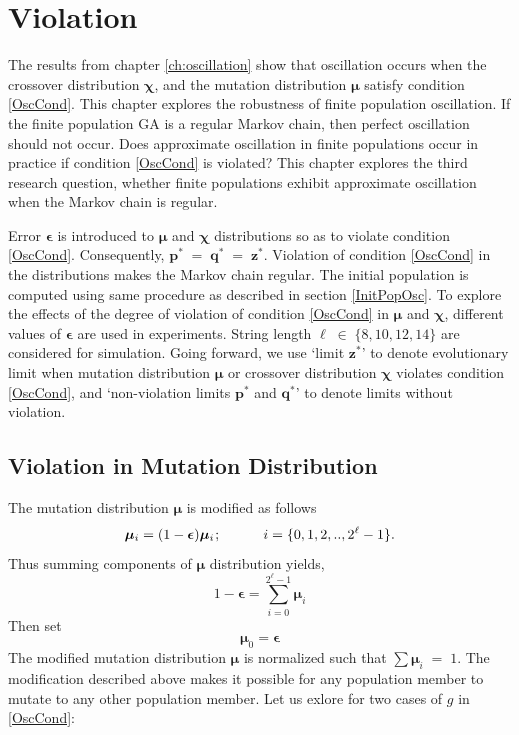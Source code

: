 \chapter{Violation} \label{ch:evolutionary limits}
The results from chapter \ref{ch:oscillation} show that oscillation occurs
when the crossover distribution $\bm{\chi}$, and the mutation distribution $\bm{\mu}$ 
satisfy condition \ref{OscCond}. This chapter explores the robustness of finite population oscillation. 
If the finite population GA is a regular Markov chain, then perfect oscillation should not occur. Does approximate oscillation 
in finite populations occur in practice if condition \ref{OscCond} is violated? 
This chapter explores the  
third research question, whether finite populations exhibit approximate oscillation when the Markov chain 
is regular.

Error $\bm{\epsilon}$ is introduced to $\bm{\mu}$ and $\bm{\chi}$ distributions so as to 
violate condition \ref{OscCond}. Consequently, $\bm{p}^\ast \;=\; \bm{q}^\ast \;=\; \bm{z}^\ast$. 
Violation of condition \ref{OscCond} in the distributions makes the Markov chain regular. The initial population is 
computed using same procedure as described in section \ref{InitPopOsc}. To explore the effects of the degree  
of violation of condition \ref{OscCond} in $\bm{\mu}$ and $\bm{\chi}$, different values of $\bm{\epsilon}$ are used in experiments. 
String length $\ell \;\in\; \{8, 10, 12, 14\}$ are considered for simulation.
Going forward, we use `limit $\bm{z}^\ast$' to denote evolutionary limit when mutation distribution $\bm{\mu}$ or crossover distribution 
$\bm{\chi}$ violates condition \ref{OscCond}, and 
`non-violation limits $\bm{p}^\ast$ and $\bm{q}^\ast$' to denote limits without violation.

\section{Violation in Mutation Distribution}
The mutation distribution $\bm{\mu}$ is modified as follows
\[
\bm{\mu}_i = (1-\bm{\epsilon}) \bm{\mu}_i \hspace{0.01in}; \hspace{30pt} i = \{0, 1, 2,.., 2^{\ell}-1\}.
\]
Thus summing components of $\bm{\mu}$ distribution yields, 
\[
1-\bm{\epsilon} = \sum \limits_{i=0}^{2^{\ell}-1} \bm{\mu}_i
\]
Then set
\[
\bm{\mu}_0 = \bm{\epsilon}
\]
The modified mutation distribution $\bm{\mu}$ is normalized such that  $\sum \bm{\mu}_i \;=\; 1$.
The modification described above makes it possible for any population member to mutate to any other population member.
Let us exlore for two cases of $g$ in \ref{OscCond}:

